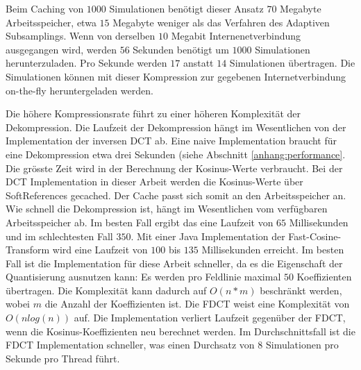 Beim Caching von $1000$ Simulationen benötigt dieser Ansatz $70$ Megabyte Arbeitsspeicher, etwa $15$ Megabyte weniger als das Verfahren des Adaptiven Subsamplings. Wenn von derselben $10$ Megabit Internenetverbindung ausgegangen wird, werden $56$ Sekunden benötigt um $1000$ Simulationen herunterzuladen. Pro Sekunde werden $17$ anstatt $14$ Simulationen übertragen. Die Simulationen können mit dieser Kompression zur gegebenen Internetverbindung on-the-fly heruntergeladen werden.

Die höhere Kompressionsrate führt zu einer höheren Komplexität der Dekompression. Die Laufzeit der Dekompression hängt im Wesentlichen von der Implementation der inversen DCT ab. Eine naive Implementation braucht für eine Dekompression etwa drei Sekunden (siehe Abschnitt \ref{anhang:performance}. Die grösste Zeit wird in der Berechnung der Kosinus-Werte verbraucht. Bei der DCT Implementation in dieser Arbeit werden die Kosinus-Werte über SoftReferences gecached. Der Cache passt sich somit an den Arbeitsspeicher an. Wie schnell die Dekompression ist, hängt im Wesentlichen vom verfügbaren Arbeitsspeicher ab. Im besten Fall ergibt das eine Laufzeit von $65$ Millisekunden und im schlechtesten Fall $350$. Mit einer Java Implementation der Fast-Cosine-Transform wird eine Laufzeit von $100$ bis $135$ Millisekunden erreicht. Im besten Fall ist die Implementation für diese Arbeit schneller, da es die Eigenschaft der Quantisierung ausnutzen kann: Es werden pro Feldlinie maximal $50$ Koeffizienten übertragen. Die Komplexität kann dadurch auf $O(n*m)$ beschränkt werden, wobei $m$ die Anzahl der Koeffizienten ist. Die FDCT weist eine Komplexität von $O(n log(n))$ auf. Die Implementation verliert Laufzeit gegenüber der FDCT, wenn die Kosinus-Koeffizienten neu berechnet werden. Im Durchschnittsfall ist die FDCT Implementation schneller, was einen Durchsatz von $8$ Simulationen pro Sekunde pro Thread führt.\\